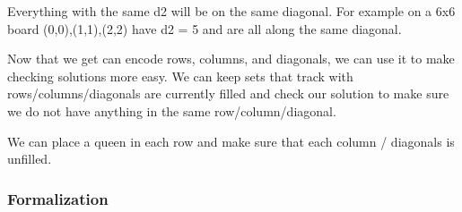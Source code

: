 \documentclass[11pt,oneside]{book}
\begin{document}
Everything with the same d2 will be on the same diagonal. For example on a 6x6 board (0,0),(1,1),(2,2) have d2 = 5 and are all along the same diagonal.

Now that we get can encode rows, columns, and diagonals, we can use it to make checking solutions more easy. We can keep sets that track with rows/columns/diagonals are currently filled and check our solution to make sure we do not have anything in the same row/column/diagonal.

We can place a queen in each row and make sure that each column / diagonals is unfilled.

\subsubsection{Formalization}
\end{document}
